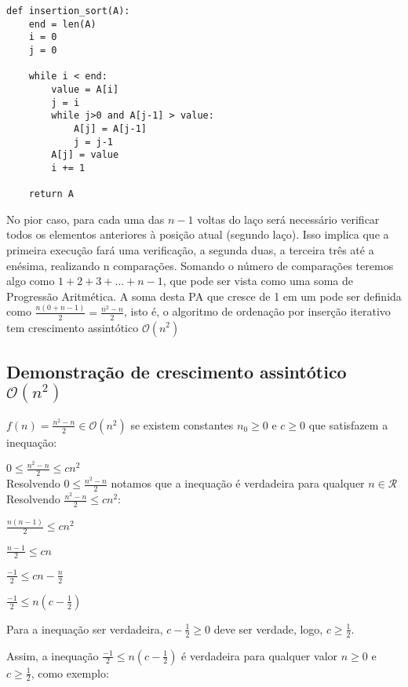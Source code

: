 \documentclass[a4paper, twocolumn]{article}
\theoremstyle{definition}
\begin{document}
\begin{lstlisting}[label=insertion_sort,caption= Insertion Sort iterativo]
def insertion_sort(A):
    end = len(A)
    i = 0
    j = 0

    while i < end:
        value = A[i]
        j = i
        while j>0 and A[j-1] > value:
            A[j] = A[j-1]
            j = j-1
        A[j] = value
        i += 1
    
    return A
\end{lstlisting}	
	
	
	No pior caso, para cada uma das $n-1$ voltas do laço será necessário verificar todos os elementos anteriores à posição atual (segundo laço). Isso implica que a primeira execução fará uma verificação, a segunda duas, a terceira três até a enésima, realizando n comparações. Somando o número de comparações teremos algo como $1+2+3+...+n-1$, que pode ser vista como uma soma de Progressão Aritmética. A soma desta PA que cresce de 1 em um pode ser definida como $\frac{n(0+n-1)}{2} = \frac{n^2-n}{2}$, isto é, o algoritmo de ordenação por inserção iterativo tem crescimento assintótico $\mathcal{O}(n^2)$
	
\subsection{Demonstração de crescimento assintótico $\mathcal{O}(n^2)$}
	
$f(n) = \frac{n^2-n}{2} \in \mathcal{O}(n^2)$ se existem constantes $n_0 \geq 0$ e $c \geq 0$ que satisfazem a inequação:

$0 \leq \frac{n^2-n}{2} \leq cn^2$ \\
 
Resolvendo $0 \leq \frac{n^2-n}{2}$ notamos que a inequação é verdadeira para qualquer $n \in \mathcal{R}$ \\

Resolvendo $\frac{n^2-n}{2} \leq cn^2$:

$\frac{n(n-1)}{2} \leq cn^2$

$\frac{n-1}{2} \leq cn$

$\frac{-1}{2} \leq cn - \frac{n}{2}$

$\frac{-1}{2} \leq n(c - \frac{1}{2})$

Para a inequação ser verdadeira, $c - \frac{1}{2} \geq 0$ deve ser verdade, logo, $c \geq \frac{1}{2}$.

Assim, a inequação $\frac{-1}{2} \leq n(c - \frac{1}{2})$ é verdadeira para qualquer valor $n \geq 0$ e $c \geq \frac{1}{2}$, como exemplo:
\end{document}
